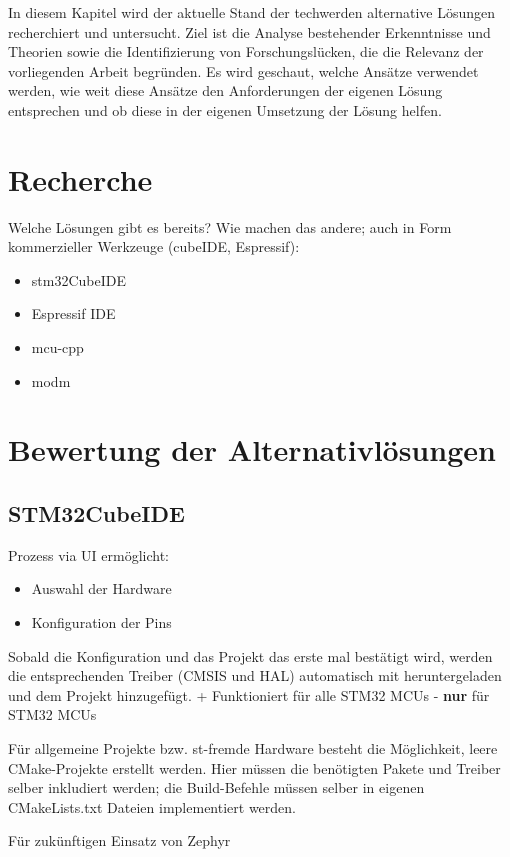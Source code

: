 In diesem Kapitel wird der aktuelle Stand der techwerden alternative Lösungen recherchiert und untersucht.
Ziel ist die Analyse bestehender Erkenntnisse und Theorien sowie die Identifizierung von Forschungslücken, die die Relevanz der vorliegenden Arbeit begründen.
Es wird geschaut, welche Ansätze verwendet werden, wie weit diese Ansätze den Anforderungen der eigenen Lösung entsprechen und ob diese in der eigenen Umsetzung der Lösung helfen.



\section{Recherche}
Welche Lösungen gibt es bereits?
Wie machen das andere; auch in Form kommerzieller Werkzeuge (cubeIDE, Espressif):
\begin{itemize}
	\item stm32CubeIDE
	\item Espressif IDE
	\item mcu-cpp
	\item modm
\end{itemize}

\section{Bewertung der Alternativlösungen}
\subsection{STM32CubeIDE}
Prozess via UI ermöglicht:
\begin{itemize}
	\item Auswahl der Hardware
	\item Konfiguration der Pins
\end{itemize}

Sobald die Konfiguration und das Projekt das erste mal bestätigt wird, werden die entsprechenden Treiber (CMSIS und HAL) automatisch mit heruntergeladen und dem Projekt hinzugefügt.
+ Funktioniert für alle STM32 MCUs
- \textbf{nur} für STM32 MCUs

Für allgemeine Projekte bzw. st-fremde Hardware besteht die Möglichkeit, leere CMake-Projekte erstellt werden.
Hier müssen die benötigten Pakete und Treiber selber inkludiert werden; die Build-Befehle müssen selber in eigenen CMakeLists.txt Dateien implementiert werden.

Für zukünftigen Einsatz von Zephyr




